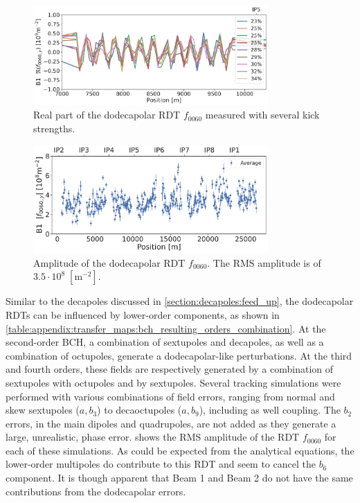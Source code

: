 \begin{figure}[!htb]
    \centering
    \includegraphics[width=0.8\textwidth]{./images/f0060y_all_meas_real.pdf}
    \caption{Real part of the dodecapolar RDT $f_{0060}$ measured with several kick strengths.}
    \label{fig:high_orders:dodecapolar_f0060}
\end{figure}

\begin{figure}[!htb]
    \centering
    \includegraphics[width=0.8\textwidth]{./images/f0060y_all_meas_avg_amp.pdf} \caption{Amplitude
    of the dodecapolar RDT $f_{0060}$. The RMS amplitude is of $3.5\cdot10^{8}\;[\text{m}^{-2}]$.}
    \label{fig:high_orders:dodecapolar_f0060_avg}
\end{figure}



Similar to the decapoles discussed in \cref{section:decapoles:feed_up}, the dodecapolar RDTs can be
influenced by lower-order components, as shown in
\cref{table:appendix:transfer_maps:bch_resulting_orders_combination}. At the second-order BCH, a
combination of sextupoles and decapoles, as well as a combination of octupoles, generate a
dodecapolar-like perturbations. At the third and fourth orders, these fields are respectively
generated by a combination of sextupoles with octupoles and by sextupoles.  
Several tracking simulations were performed with various combinations of field errors, ranging from
normal and skew sextupoles ($a,b_3$) to decaoctupoles ($a,b_9$), including as well coupling.
The $b_2$ errors, in the main dipoles and quadrupoles, are not added as they generate a large,
unrealistic, phase error.
 shows the RMS amplitude of the RDT $f_{0060}$ for each of
these simulations. As could be expected from the analytical equations, the lower-order multipoles do
contribute to this RDT and seem to cancel the $b_6$ component. It is though apparent that Beam 1 and
Beam 2 do not have the same contributions from the dodecapolar errors. 


